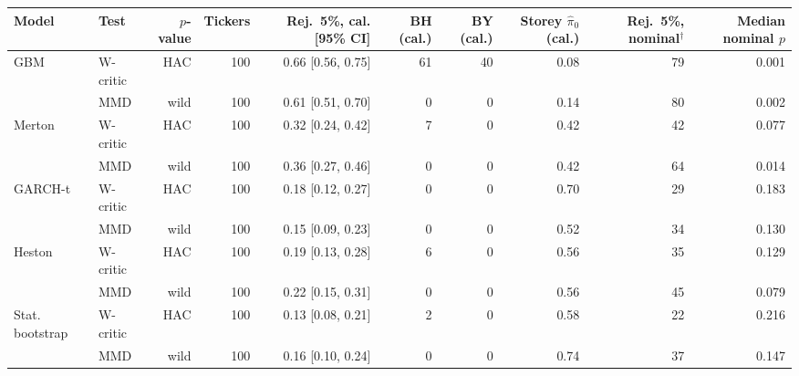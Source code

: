 \begin{tabular}{llrrrrrrrr}
\toprule
Model & Test & $p$-value & Tickers & Rej.\ 5\%, cal. [95\% CI] & BH (cal.) & BY (cal.) & Storey $\hat\pi_0$ (cal.) & Rej.\ 5\%, nominal$^{\dagger}$ & Median nominal $p$ \\
\midrule
GBM & W-critic & HAC & 100 & 0.66 [0.56, 0.75] & 61 & 40 & 0.08 & 79 & 0.001 \\
 & MMD & wild & 100 & 0.61 [0.51, 0.70] & 0 & 0 & 0.14 & 80 & 0.002 \\
Merton & W-critic & HAC & 100 & 0.32 [0.24, 0.42] & 7 & 0 & 0.42 & 42 & 0.077 \\
 & MMD & wild & 100 & 0.36 [0.27, 0.46] & 0 & 0 & 0.42 & 64 & 0.014 \\
GARCH-t & W-critic & HAC & 100 & 0.18 [0.12, 0.27] & 0 & 0 & 0.70 & 29 & 0.183 \\
 & MMD & wild & 100 & 0.15 [0.09, 0.23] & 0 & 0 & 0.52 & 34 & 0.130 \\
Heston & W-critic & HAC & 100 & 0.19 [0.13, 0.28] & 6 & 0 & 0.56 & 35 & 0.129 \\
 & MMD & wild & 100 & 0.22 [0.15, 0.31] & 0 & 0 & 0.56 & 45 & 0.079 \\
Stat. bootstrap & W-critic & HAC & 100 & 0.13 [0.08, 0.21] & 2 & 0 & 0.58 & 22 & 0.216 \\
 & MMD & wild & 100 & 0.16 [0.10, 0.24] & 0 & 0 & 0.74 & 37 & 0.147 \\
\bottomrule
\end{tabular}
